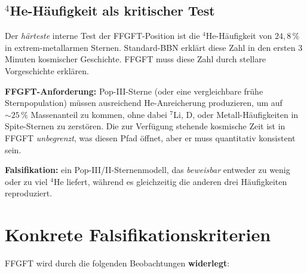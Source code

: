 \subsection{\texorpdfstring{$^4$He-Häufigkeit als kritischer Test}{4He-Haeufigkeit als kritischer Test}}

Der \emph{härteste} interne Test der FFGFT-Position ist die
$^4$He-Häufigkeit von $24{,}8\,\%$ in extrem-metallarmen Sternen.
Standard-BBN erklärt diese Zahl in den ersten 3 Minuten kosmischer
Geschichte. FFGFT muss diese Zahl durch stellare Vorgeschichte
erklären.

\textbf{FFGFT-Anforderung:} Pop-III-Sterne (oder eine vergleichbare
frühe Sternpopulation) müssen ausreichend He-Anreicherung
produzieren, um auf $\sim 25\,\%$ Massenanteil zu kommen, ohne
dabei $^7$Li, D, oder Metall-Häufigkeiten in Spite-Sternen zu
zerstören. Die zur Verfügung stehende kosmische Zeit ist in FFGFT
\emph{unbegrenzt}, was diesen Pfad öffnet, aber er muss
quantitativ konsistent sein.

\textbf{Falsifikation:} ein Pop-III/II-Sternenmodell, das
\emph{beweisbar} entweder zu wenig oder zu viel $^4$He liefert,
während es gleichzeitig die anderen drei Häufigkeiten reproduziert.

\section{Konkrete Falsifikationskriterien}

FFGFT wird durch die folgenden Beobachtungen \textbf{widerlegt}:

